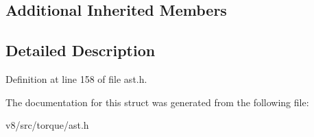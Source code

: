 \subsection*{Additional Inherited Members}


\subsection{Detailed Description}


Definition at line 158 of file ast.\+h.



The documentation for this struct was generated from the following file\+:\begin{DoxyCompactItemize}
\item 
v8/src/torque/ast.\+h\end{DoxyCompactItemize}

